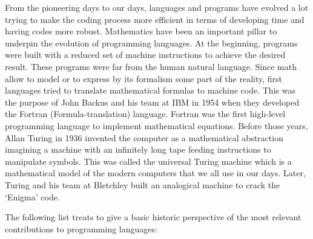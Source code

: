From the pioneering days to our days, languages and programs have evolved 
a lot trying to make the coding process more efficient in terms of developing time 
and having codes more robust. Mathematics have been an important pillar to underpin
the evolution of programming  languages. 
At the beginning, programs were built with a reduced set of machine instructions 
to achieve the desired result. These programs were far from the human natural language.
Since math allow to model or to express by its formalism some part of the reality, first 
languages tried to translate mathematical formulas to machine code. This was the purpose 
of John Backus and his team at IBM in 1954 when they developed 
the Fortran (Formula-translation) language. 
Fortran was the first high-level programming language to implement mathematical equations. 
Before those years, Allan Turing in 1936 invented the computer as a mathematical  abstraction 
imagining a machine with an infinitely long tape feeding instructions to manipulate symbols. 
This was called the universal Turing machine 
which is a mathematical model of the modern computers that we all use in our days. 
Later, Turing and his team at Bletchley built an analogical machine 
to crack the ‘Enigma’ code. 
  
  
\newpage 
The following list treats to give a basic historic perspective
of the most relevant contributions  to programming languages:
 
